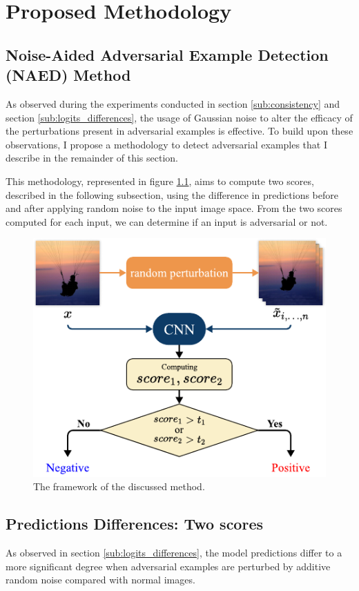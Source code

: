 \chapter{Proposed Methodology}
\label{Methodology}
\overridetextsize

\section{Noise-Aided Adversarial Example Detection (NAED) Method}
As observed during the experiments conducted in section \ref{sub:consistency}
and section \ref{sub:logits_differences}, the usage of Gaussian noise to alter
the efficacy of the perturbations present in adversarial examples is effective.
To build upon these observations, I propose a methodology to detect adversarial
examples that I describe in the remainder of this section.

This methodology, represented in figure \ref{fig:framework}, aims to compute two
scores, described in the following subsection, using the difference in
predictions before and after applying random noise to the input image space.
From the two scores computed for each input, we can determine if an input is
adversarial or not.

\begin{figure}[htp]
    \centering
    \includegraphics[clip,width=0.9\columnwidth]{Figures/methodology/Framework.pdf}%

    \caption{The framework of the discussed method.}
    \label{fig:framework}
\end{figure}

\section{Predictions Differences: Two scores}
\label{sub:detection_metrics}
As observed in section \ref{sub:logits_differences}, the model predictions
differ to a more significant degree when adversarial examples are perturbed by
additive random noise compared with normal images.

